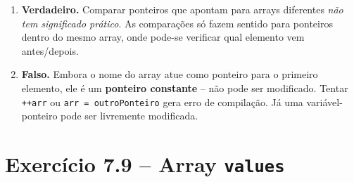 \documentclass[12pt,a4paper]{article}
\begin{document}
\begin{respostabox}
\begin{enumerate}[label=\textbf{\alph*)}]

\item \textcolor{deitelgreen}{\textbf{Verdadeiro.}} Comparar ponteiros que apontam
para arrays diferentes \textit{não tem significado prático}. As comparações só
fazem sentido para ponteiros dentro do mesmo array, onde pode-se verificar
qual elemento vem antes/depois.

\item \textcolor{deitelred}{\textbf{Falso.}} Embora o nome do array atue como
ponteiro para o primeiro elemento, ele é um \textbf{ponteiro constante} -- não pode
ser modificado. Tentar \texttt{++arr} ou \texttt{arr = outroPonteiro} gera erro de
compilação. Já uma variável-ponteiro pode ser livremente modificada.
\end{enumerate}
\end{respostabox}

\section{Exercício 7.9 -- Array \texttt{values}}
\end{document}
